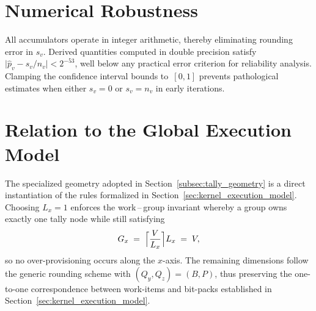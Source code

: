 \section{Numerical Robustness}
\label{subsec:tally_numerics}

All accumulators operate in integer arithmetic, thereby eliminating rounding
error in \(s_v\).  Derived quantities computed in double precision satisfy
\(\lvert\widehat{p}_v - s_v/n_v\rvert < 2^{-53}\), well below any practical
error criterion for reliability analysis.  Clamping the confidence interval
bounds to~\([0,1]\) prevents pathological estimates when either \(s_v=0\) or
\(s_v=n_v\) in early iterations.

\section{Relation to the Global Execution Model}
\label{subsec:tally_exec_relation}

The specialized geometry adopted in Section~\ref{subsec:tally_geometry} is a direct instantiation of the rules formalized in Section~\ref{sec:kernel_execution_model}.  Choosing $L_x=1$ enforces the work\,–\,group invariant whereby a group owns exactly one tally node while still satisfying
\[
   G_x \;=\; \Bigl\lceil \frac{V}{L_x} \Bigr\rceil L_x \;=\; V ,
\]
so no over-provisioning occurs along the $x$-axis.  The remaining dimensions follow the generic rounding scheme with $(Q_y,Q_z)=(B,P)$, thus preserving the one-to-one correspondence between work-items and bit-packs established in Section~\ref{sec:kernel_execution_model}.